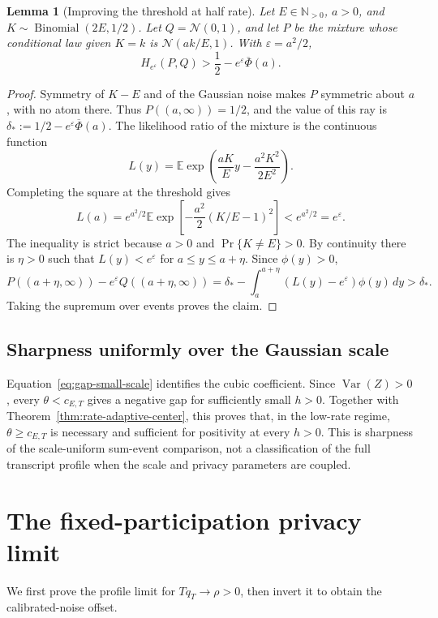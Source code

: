 \documentclass[11pt]{article}
\newtheorem{lemma}[theorem]{Lemma}
\theoremstyle{remark}
\newcommand{\N}{\mathbb N}
\newcommand{\E}{\mathbb E}
\newcommand{\Normal}{\mathcal N}
\begin{document}
\begin{lemma}[Improving the threshold at half rate]\label{lem:strict-average-endpoint}
Let $E\in\N_{>0}$, $a>0$, and $K\sim\operatorname{Binomial}(2E,1/2)$.
Let $Q=\Normal(0,1)$, and let $P$ be the mixture whose conditional law
given $K=k$ is $\Normal(ak/E,1)$. With $\varepsilon=a^2/2$,
\[
 H_{e^\varepsilon}(P, Q)
 >\frac12-e^\varepsilon\overline\Phi(a).
\]
\end{lemma}

\begin{proof}
Symmetry of $K-E$ and of the Gaussian noise makes $P$ symmetric about
$a$, with no atom there. Thus $P((a,\infty))=1/2$, and the value of this
ray is $\delta_*:=1/2-e^\varepsilon\overline\Phi(a)$.
The likelihood ratio of the mixture is the continuous function
\[
 L(y)=\E\exp\!\left(\frac{aK}{E}y-\frac{a^2K^2}{2E^2}\right).
\]
Completing the square at the threshold gives
\[
 L(a)=e^{a^2/2}\E\exp\!\left[
       -\frac{a^2}{2}(K/E-1)^2\right]<e^{a^2/2}=e^\varepsilon.
\]
The inequality is strict because $a>0$ and $\Pr\{K\ne E\}>0$.
By continuity there is $\eta>0$ such that $L(y)<e^\varepsilon$ for
$a\leq y\leq a+\eta$. Since $\phi(y)>0$,
\[
 P((a+\eta,\infty))-e^\varepsilon Q((a+\eta,\infty))
 =\delta_*-\int_a^{a+\eta}(L(y)-e^\varepsilon)\phi(y)\,dy
 >\delta_*.
\]
Taking the supremum over events proves the claim.
\end{proof}

\subsection{Sharpness uniformly over the Gaussian scale}
Equation~\eqref{eq:gap-small-scale} identifies the cubic coefficient.
Since $\operatorname{Var}(Z)>0$, every $\theta<c_{E,T}$ gives a negative gap
for sufficiently small $h>0$. Together with
Theorem~\ref{thm:rate-adaptive-center}, this proves that, in the low-rate
regime, $\theta\geq c_{E,T}$ is necessary and sufficient for positivity at
every $h>0$. This is sharpness of the scale-uniform sum-event comparison,
not a classification of the full transcript profile when the scale and
privacy parameters are coupled.

\section{The fixed-participation privacy limit}\label{app:sparse-limit}
We first prove the profile limit for $Tq_T\to\rho>0$, then invert it to
obtain the calibrated-noise offset.
\end{document}
